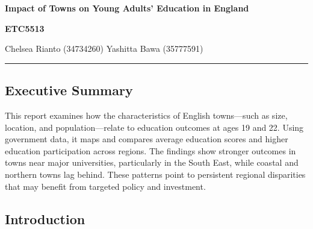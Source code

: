 \documentclass[
  letterpaper,
  DIV=11,
  numbers=noendperiod]{scrartcl}
\author{}
\date{}
\renewcommand*\contentsname{Table of contents}
\newcommand\contentsname{Table of contents}
\begin{document}
\begin{titlepage}
  \centering
  \vspace*{\fill}

  {\fontsize{34}{36}\selectfont\bfseries\color{pastelblue} Impact of Towns on Young Adults' Education in England \par}
  \vspace{1.2cm}

  {\fontsize{18}{20}\selectfont\bfseries ETC5513 \par}
  \vspace{2cm}

  {\fontsize{16}{18}\selectfont Chelsea Rianto (34734260) \quad Yashitta Bawa (35777591) \par}
  \vspace{1.5cm}

  \vspace*{\fill}
\end{titlepage}
\clearpage

\renewcommand*\contentsname{Table of contents}
{
\hypersetup{linkcolor=}
\setcounter{tocdepth}{2}
\tableofcontents
}

\begin{center}\rule{0.5\linewidth}{0.5pt}\end{center}

\newpage

\subsection{Executive Summary}\label{executive-summary}

This report examines how the characteristics of English towns---such as
size, location, and population---relate to education outcomes at ages 19
and 22. Using government data, it maps and compares average education
scores and higher education participation across regions. The findings
show stronger outcomes in towns near major universities, particularly in
the South East, while coastal and northern towns lag behind. These
patterns point to persistent regional disparities that may benefit from
targeted policy and investment.

\subsection{Introduction}\label{introduction}
\end{document}

